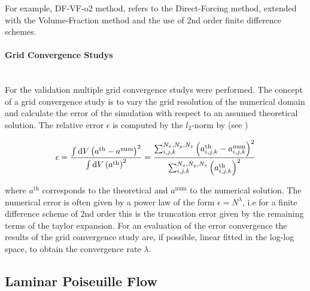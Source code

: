For example, DF-VF-o2 method, refers to the Direct-Forcing method, extended with the Volume-Fraction
method and the use of 2nd order finite difference schemes.

\paragraph{Grid Convergence Studys}\mbox{}\\

For the validation multiple grid convergence studys were performed.
The concept of a grid convergence study is to vary the grid resolution of the numerical domain and
calculate the error of the simulation with respect to an assumed theoretical solution.
The relative error $\epsilon$ is computed by the $l_2$-norm by (see \citep{QUELLE})

\begin{align}
    \epsilon = \frac{\int \mathop{}\!\mathrm{d} V \left(a^{\text{th}} - a^{\text{num}}\right)^2}{\int \mathop{}\!\mathrm{d} V \left( a^{\text{th}} \right)^2}
     = \frac{\sum_{i,j,k}^{N_x, N_y, N_z}
      \left(a^{\text{th}}_{i,j,k}  - a^{\text{num}}_{i, j, k}  \right)^2}
     {\sum_{i,j,k}^{N_x, N_y, N_z} \left( a^{\text{th}}_{i,j,k} \right)^2}
 \end{align}

where $a^{\text{th}}$ corresponds to the theoretical and $a^{\text{num}}$ to the numerical solution.
The numerical error is often given by a power law of the form $\epsilon = N^\lambda$, i.e for a finite difference scheme of 2nd order
this is the truncation error given by the remaining terms  of the taylor expansion.
For an evaluation of the error convergence the results of the grid convergence study are, if possible, linear fitted in the log-log space, to obtain the
convergence rate $\lambda$.

\clearpage

\subsection{Laminar Poiseuille Flow}

